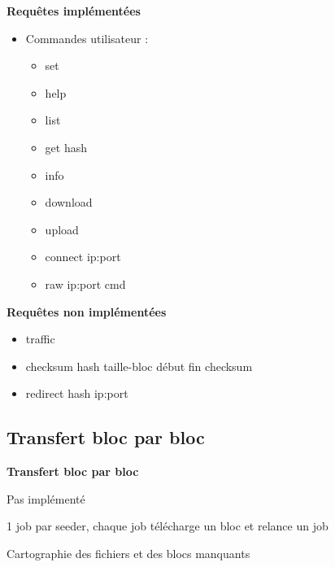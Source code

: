 \documentclass{beamer}
\begin{document}
\begin{frame}
    \textbf{Requêtes implémentées}
    \begin{itemize}
        \item Commandes utilisateur :
            \begin{itemize}
                \item set
                \item help
                \item list
                \item get hash
                \item info
                \item download
                \item upload
                \item connect ip:port
                \item raw ip:port cmd
            \end{itemize}
    \end{itemize}
\end{frame}

\begin{frame}
    \textbf{Requêtes non implémentées}
    \begin{itemize}
        \item traffic
        \item checksum hash taille-bloc début fin checksum
        \item redirect hash ip:port
    \end{itemize}
\end{frame}

\begin{frame}
    \section{Transfert bloc par bloc}

    \textbf{Transfert bloc par bloc}

    \item Pas implémenté

    \item 1 job par seeder, chaque job télécharge un bloc et relance un job

    \item Cartographie des fichiers et des blocs manquants

\end{frame}
\end{document}
